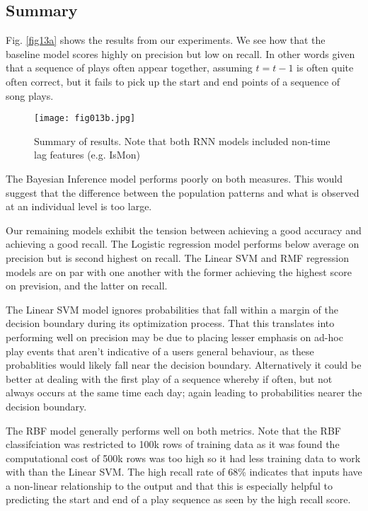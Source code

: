 \subsection{Summary}

Fig. \ref{fig13a} shows the results from our experiments. We see how that the baseline model scores highly on precision but low on recall. In other words given that a sequence of plays often appear together, assuming $t = t-1$ is often quite often correct, but it fails to pick up the start and end points of a sequence of song plays.

\begin{figure}[h!]
	\centering
	\texttt{[image: fig013b.jpg]}
	\caption{Summary of results. Note that both RNN models included non-time lag features (e.g. IsMon)}
	\label{fig13b}
\end{figure}  

The Bayesian Inference model performs poorly on both measures. This would suggest that the difference between the population patterns and what is observed at an individual level is too large.

Our remaining models exhibit the tension between achieving a good accuracy and achieving a good recall. The Logistic regression model performs below average on precision but is second highest on recall. The Linear SVM and RMF regression models are on par with one another with the former achieving the highest score on prevision, and the latter on recall. 

The Linear SVM model ignores probabilities that fall within a margin of the decision boundary during its optimization process. That this translates into performing well on precision may be due to placing lesser emphasis on ad-hoc play events that aren't indicative of a users general behaviour, as these probablities would likely fall near the decision boundary. Alternatively it could be better at dealing with the first play of a sequence whereby if often, but not always occurs at the same time each day; again leading to probabilities nearer the decision boundary.

The RBF model generally performs well on both metrics. Note that the RBF classifciation was restricted to 100k rows of training data as it was found the computational cost of 500k rows was too high so it had less training data to work with than the Linear SVM. The high recall rate of 68\% indicates that inputs have a non-linear relationship to the output and that this is especially helpful to predicting the start and end of a play sequence as seen by the high recall score. 
 

